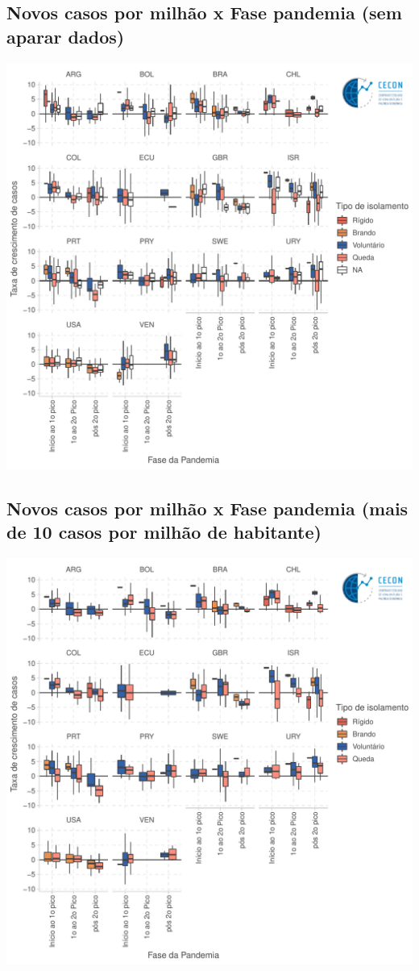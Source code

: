 \documentclass{SelfArx}
\begin{document}
\subsection*{Novos casos por milhão x Fase pandemia (sem aparar dados)}
\label{sec:orgbbda54b}
\begin{center}
\includegraphics[width=.9\linewidth]{./figs/COVID/Casos_Policy_Todos.pdf}
\end{center}


\subsection*{Novos casos por milhão x Fase pandemia (mais de 10 casos por milhão de habitante)}
\label{sec:org876921e}

\begin{center}
\includegraphics[width=.9\linewidth]{./figs/COVID/Casos_Policy_10_Todos.pdf}
\end{center}
\end{document}
